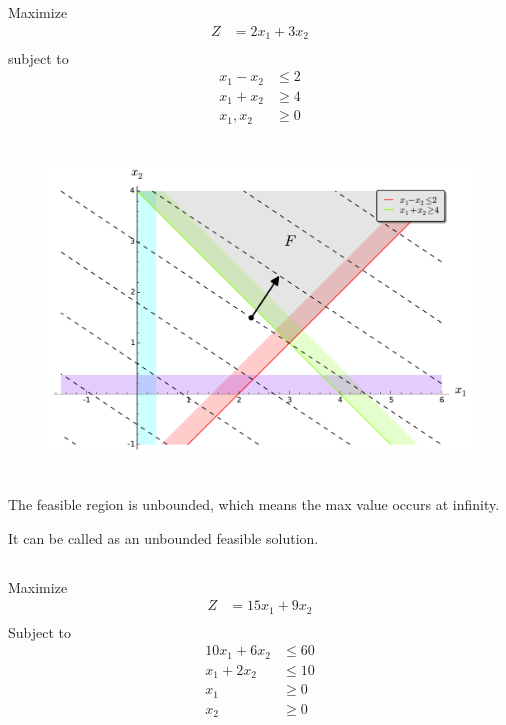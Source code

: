 \documentclass[12pt]{article}
\begin{document}
\newpage
\subsection{}
Maximize 
\begin{align*}
Z       & = 2 x_1+3 x_2 \\
\end{align*}
subject to 
\begin{align*}
x_1-x_2 & \le 2         \\
x_1+x_2 & \ge 4         \\
x_1,x_2 & \ge 0
\end{align*}
  \begin{figure}[H]
    \centering
\includegraphics[height=3.5in]{./images/p3_4.pdf}
\end{figure}

The feasible region is unbounded, which means the max value occurs at infinity.

It can be called as an unbounded feasible solution.

\newpage
\subsection{}
Maximize 
\begin{align*}
Z            & = 15 x_1 + 9 x_2 \\
\end{align*}
Subject to 
\begin{align*}
10 x_1+6 x_2 & \le 60           \\
x_1+2 x_2    & \le 10           \\
x_1          & \ge 0            \\
x_2          & \ge 0            \\
\end{align*}
\end{document}
